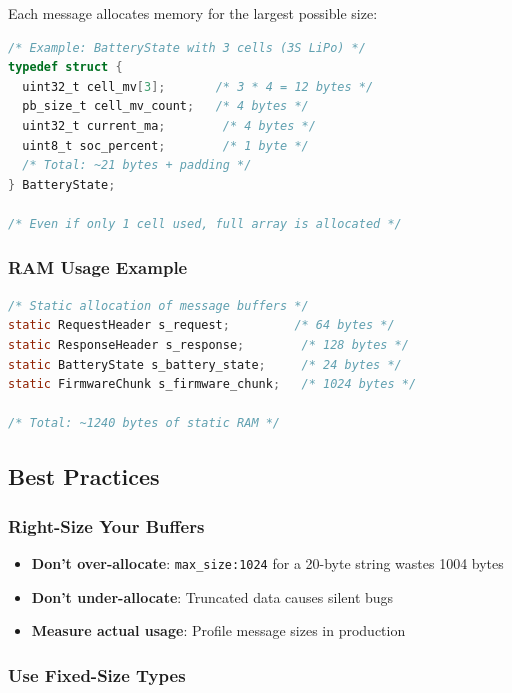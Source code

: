 Each message allocates memory for the largest possible size:

\begin{lstlisting}[language=C]
/* Example: BatteryState with 3 cells (3S LiPo) */
typedef struct {
  uint32_t cell_mv[3];       /* 3 * 4 = 12 bytes */
  pb_size_t cell_mv_count;   /* 4 bytes */
  uint32_t current_ma;        /* 4 bytes */
  uint8_t soc_percent;        /* 1 byte */
  /* Total: ~21 bytes + padding */
} BatteryState;

/* Even if only 1 cell used, full array is allocated */


\end{lstlisting}
\subsubsection{RAM Usage Example}

\begin{lstlisting}[language=C]
/* Static allocation of message buffers */
static RequestHeader s_request;         /* 64 bytes */
static ResponseHeader s_response;        /* 128 bytes */
static BatteryState s_battery_state;     /* 24 bytes */
static FirmwareChunk s_firmware_chunk;   /* 1024 bytes */

/* Total: ~1240 bytes of static RAM */


\end{lstlisting}
\subsection{Best Practices}

\subsubsection{Right-Size Your Buffers}

\begin{itemize}
\item \textbf{Don't over-allocate}: \texttt{max\_size:1024} for a 20-byte string wastes 1004 bytes
\item \textbf{Don't under-allocate}: Truncated data causes silent bugs
\item \textbf{Measure actual usage}: Profile message sizes in production
\end{itemize}

\subsubsection{Use Fixed-Size Types}

